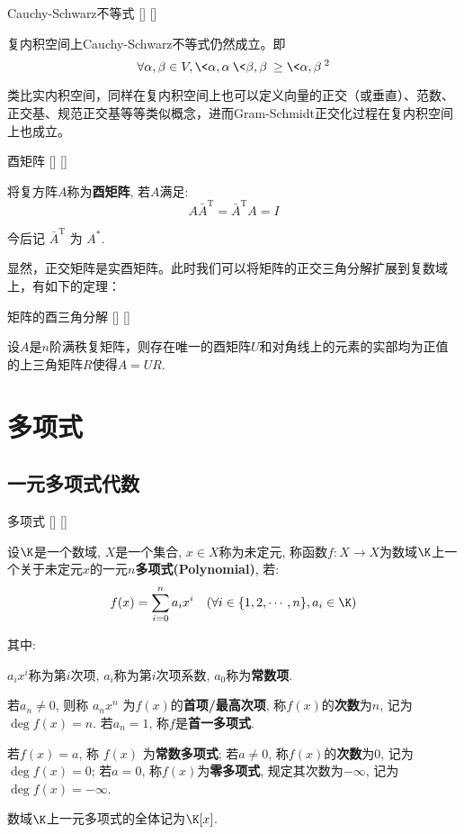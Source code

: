 \documentclass[UTF8]{ctexart}
\begin{document}
		\begin{thm}
			[]
			{Cauchy-Schwarz不等式}
			[]
			[]

			复内积空间上Cauchy-Schwarz不等式仍然成立。即\[\forall\alpha, \beta\in V, \<\alpha,\alpha\>\<\beta,\beta\>\geq\<\alpha,\beta\>^2\]
		\end{thm}

		类比实内积空间，同样在复内积空间上也可以定义向量的正交（或垂直）、范数、正交基、规范正交基等等类似概念，进而Gram-Schmidt正交化过程在复内积空间上也成立。

		\begin{dfn}
			[]
			{酉矩阵}
			[]
			[]

			将复方阵$A$称为\textbf{酉矩阵}, 若$A$满足: 
			\[A\bar{A}^\mathrm{T}=\bar{A}^\mathrm{T}A=I\]

			今后记 $\bar{A}^\mathrm{T}$ 为 $A^*$.
		\end{dfn}

		显然，正交矩阵是实酉矩阵。此时我们可以将矩阵的正交三角分解扩展到复数域上，有如下的定理：

		\begin{thm}
			[]
			{矩阵的酉三角分解}
			[]
			[]

			设$A$是$n$阶满秩复矩阵，则存在唯一的酉矩阵$U$和对角线上的元素的实部均为正值的上三角矩阵$R$使得$A=UR$.
		\end{thm}

\section{多项式}
	
	\subsection{一元多项式代数}
		
		\begin{dfn}
			[]
			{多项式}
			[]
			[]

			设$\K$是一个数域, $X$是一个集合, $x\in X$称为未定元, 称函数$f:X\to X$为数域$\K$上一个关于未定元$x$的一元$n$\textbf{多项式(Polynomial)}, 若: 
			\[f(x)=\sum_{i=0}^n a_i x^i\quad(\forall i\in\{1,2,\cdots,n\}, a_i\in\K)\]

			其中: 
			
			$a_i x^i$称为第$i$次项, $a_i$称为第$i$次项系数, $a_0$称为\textbf{常数项}. 

			若$a_n\neq 0$, 则称 $a_n x^n$ 为$f(x)$的\textbf{首项/最高次项}, 称$f(x)$的\textbf{次数}为$n$, 记为$\deg f(x)=n$. 若$a_n=1$, 称$f$是\textbf{首一多项式}. 

			若$f(x)=a$, 称 $f(x)$ 为\textbf{常数多项式}; 若$a\neq 0$, 称$f(x)$的\textbf{次数}为$0$, 记为$\deg f(x)=0$; 若$a=0$, 称$f(x)$为\textbf{零多项式}, 规定其次数为$-\infty$, 记为$\deg f(x)=-\infty$. 

			数域$\K$上一元多项式的全体记为$\K[x]$. 
		\end{dfn}
		
\end{document}
